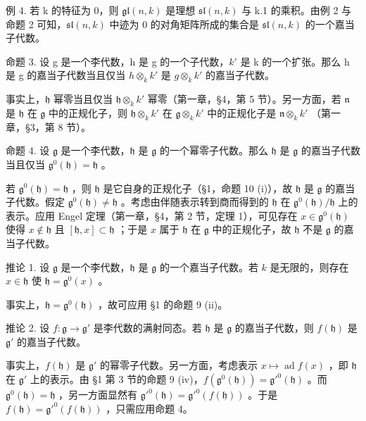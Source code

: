 例 4. 若 k 的特征为 0，则 \(\mathfrak{gl}(n,k)\) 是理想 \(\mathfrak{sl}(n,k)\) 与 k.1 的乘积。由例 2 与命题 2 可知，\(\mathfrak{sl}(n,k)\) 中迹为 0 的对角矩阵所成的集合是 \(\mathfrak{sl}(n,k)\) 的一个嘉当子代数。

命题 3. 设 g 是一个李代数，h 是 g 的一个子代数，\(k'\) 是 k 的一个扩张。那么 h 是 g 的嘉当子代数当且仅当 \(h \otimes_{k} k'\) 是 \(g \otimes_{k} k'\) 的嘉当子代数。

事实上，\(\mathfrak{h}\) 幂零当且仅当 \(\mathfrak{h} \otimes_k k'\) 幂零（第一章，§4，第 5 节）。另一方面，若 \(\mathfrak{n}\) 是 \(\mathfrak{h}\) 在 \(\mathfrak{g}\) 中的正规化子，则 \(\mathfrak{h} \otimes_k k'\) 在 \(\mathfrak{g} \otimes_k k'\) 中的正规化子是 \(\mathfrak{n} \otimes_k k'\) （第一章，§3，第 8 节）。

命题 4. 设 \(\mathfrak{g}\) 是一个李代数，\(\mathfrak{h}\) 是 \(\mathfrak{g}\) 的一个幂零子代数。那么 \(\mathfrak{h}\) 是 \(\mathfrak{g}\) 的嘉当子代数当且仅当 \(\mathfrak{g}^0 (\mathfrak{h}) = \mathfrak{h}\) 。

若 \(\mathfrak{g}^0 (\mathfrak{h}) = \mathfrak{h}\) ，则 \(\mathfrak{h}\) 是它自身的正规化子（§1，命题 10 (i)），故 \(\mathfrak{h}\) 是 \(\mathfrak{g}\) 的嘉当子代数。假定 \(\mathfrak{g}^0 (\mathfrak{h})\neq \mathfrak{h}\) 。考虑由伴随表示转到商而得到的 \(\mathfrak{h}\) 在 \(\mathfrak{g}^0 (\mathfrak{h}) / \mathfrak{h}\) 上的表示。应用 Engel 定理（第一章，§4，第 2 节，定理 1），可见存在 \(x\in \mathfrak{g}^0 (\mathfrak{h})\) 使得 \(x\notin \mathfrak{h}\) 且 \([\mathfrak{h},x]\subset \mathfrak{h}\) ；于是 \(x\) 属于 \(\mathfrak{h}\) 在 \(\mathfrak{g}\) 中的正规化子，故 \(\mathfrak{h}\) 不是 \(\mathfrak{g}\) 的嘉当子代数。

推论 1. 设 \(\mathfrak{g}\) 是一个李代数，\(\mathfrak{h}\) 是 \(\mathfrak{g}\) 的一个嘉当子代数。若 \(k\) 是无限的，则存在 \(x \in \mathfrak{h}\) 使 \(\mathfrak{h} = \mathfrak{g}^0(x)\) 。

事实上，\(\mathfrak{h} = \mathfrak{g}^0 (\mathfrak{h})\) ，故可应用 §1 的命题 9 (ii)。

推论 2. 设 \(f: \mathfrak{g} \to \mathfrak{g}'\) 是李代数的满射同态。若 \(\mathfrak{h}\) 是 \(\mathfrak{g}\) 的嘉当子代数，则 \(f(\mathfrak{h})\) 是 \(\mathfrak{g}'\) 的嘉当子代数。

事实上，\(f(\mathfrak{h})\) 是 \(\mathfrak{g}'\) 的幂零子代数。另一方面，考虑表示 \(x \mapsto \operatorname{ad} f(x)\) ，即 \(\mathfrak{h}\) 在 \(\mathfrak{g}'\) 上的表示。由 §1 第 3 节的命题 9 (iv)，\(f(\mathfrak{g}^0(\mathfrak{h})) = \mathfrak{g}'^0(\mathfrak{h})\) 。而 \(\mathfrak{g}^0(\mathfrak{h}) = \mathfrak{h}\) ，另一方面显然有 \(\mathfrak{g}'^0(\mathfrak{h}) = \mathfrak{g}'^0(f(\mathfrak{h}))\) 。于是 \(f(\mathfrak{h}) = \mathfrak{g}'^0(f(\mathfrak{h}))\) ，只需应用命题 4。

